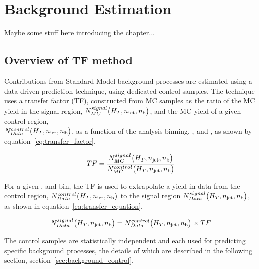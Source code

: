\chapter{Background Estimation}
\label{ch:6}

\ifpdf
    \graphicspath{{Chapter6/Figs/Raster/}{Chapter6/Figs/PDF/}{Chapter6/Figs/}}
\else
    \graphicspath{{Chapter6/Figs/Vector/}{Chapter6/Figs/}}
\fi

Maybe some stuff here introducing the chapter...

\section{Overview of TF method}  %
\label{sec:background_overview}

Contributions from Standard Model background processes are estimated using a data-driven 
prediction technique, using dedicated control samples. The 
technique uses a transfer factor (TF), constructed from MC samples as the ratio 
of the MC yield in the signal region, $N_{MC}^{signal}\big(H_T, n_{\text{jet}}, n_{\text{b}}\big)$,
and the MC yield of a given control region, \\$N_{Data}^{control}\big(H_T, n_{\text{jet}}, n_{\text{b}}\big)$,
as a function of the analysis binning, \HT, \nj and \nb, as shown by
equation~\ref{eq:transfer_factor}.

\begin{equation}
TF = \frac{N_{MC}^{signal}\big(H_T, n_{\text{jet}}, n_{\text{b}}\big)}{N_{MC}^{control}\big(H_T, n_{\text{jet}}, n_{\text{b}}\big)}
\label{eq:transfer_factor}
\end{equation}

For a given \HT, \nj and \nb bin, the TF is used to extrapolate a yield in data from
the control region, $N_{Data}^{control}\big(H_T, n_{\text{jet}}, n_{\text{b}}\big)$
to the signal region $N_{Data}^{signal}\big(H_T, n_{\text{jet}}, n_{\text{b}}\big)$, as shown in
equation~\ref{eq:transfer_equation}.

\begin{equation}
N_{Data}^{signal}\big(H_T, n_{\text{jet}}, n_{\text{b}}\big) = N_{Data}^{control}\big(H_T, n_{\text{jet}}, n_{\text{b}}\big)
\times TF
\label{eq:transfer_equation}
\end{equation}

The control samples are statistically independent and each used for predicting 
specific background processes, the details of which are described in 
the following section, section~\ref{sec:background_control}.

